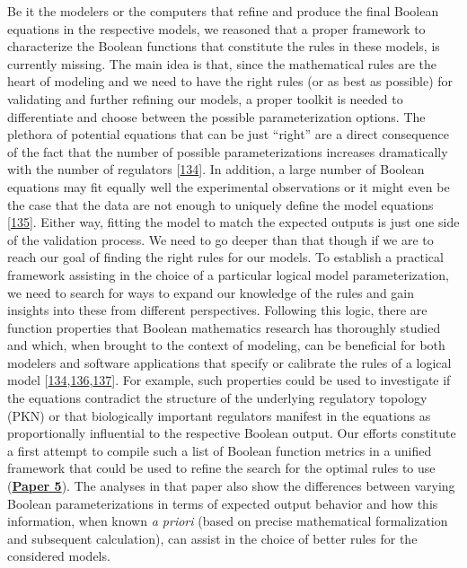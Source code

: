 \documentclass[
  12pt,
]{book}
\begin{document}
Be it the modelers or the computers that refine and produce the final Boolean equations in the respective models, we reasoned that a proper framework to characterize the Boolean functions that constitute the rules in these models, is currently missing.
The main idea is that, since the mathematical rules are the heart of modeling and we need to have the right rules (or as best as possible) for validating and further refining our models, a proper toolkit is needed to differentiate and choose between the possible parameterization options.
The plethora of potential equations that can be just ``right'' are a direct consequence of the fact that the number of possible parameterizations increases dramatically with the number of regulators {[}\protect\hyperlink{ref-Cury2019}{134}{]}.
In addition, a large number of Boolean equations may fit equally well the experimental observations or it might even be the case that the data are not enough to uniquely define the model equations {[}\protect\hyperlink{ref-Saez-Rodriguez2009}{135}{]}.
Either way, fitting the model to match the expected outputs is just one side of the validation process.
We need to go deeper than that though if we are to reach our goal of finding the right rules for our models.
To establish a practical framework assisting in the choice of a particular logical model parameterization, we need to search for ways to expand our knowledge of the rules and gain insights into these from different perspectives.
Following this logic, there are function properties that Boolean mathematics research has thoroughly studied and which, when brought to the context of modeling, can be beneficial for both modelers and software applications that specify or calibrate the rules of a logical model {[}\protect\hyperlink{ref-Cury2019}{134},\protect\hyperlink{ref-Shmulevich2004}{136},\protect\hyperlink{ref-Gherardi2016}{137}{]}.
For example, such properties could be used to investigate if the equations contradict the structure of the underlying regulatory topology (PKN) or that biologically important regulators manifest in the equations as proportionally influential to the respective Boolean output.
Our efforts constitute a first attempt to compile such a list of Boolean function metrics in a unified framework that could be used to refine the search for the optimal rules to use (\textbf{\protect\hyperlink{Paper5}{Paper 5}}).
The analyses in that paper also show the differences between varying Boolean parameterizations in terms of expected output behavior and how this information, when known \emph{a priori} (based on precise mathematical formalization and subsequent calculation), can assist in the choice of better rules for the considered models.
\end{document}
